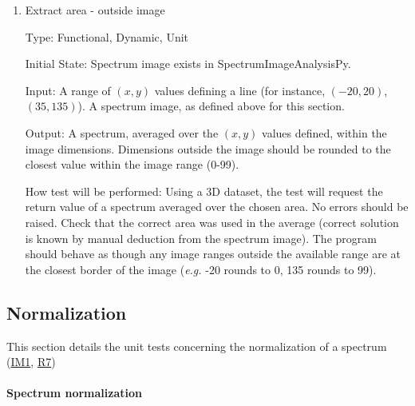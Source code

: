 \documentclass[12pt, titlepage]{article}
\newcommand{\progname}{SpectrumImageAnalysisPy}
\begin{document}
\begin{enumerate}
\item{Extract area - outside image}

Type: Functional, Dynamic, Unit

Initial State: Spectrum image exists in \progname{}.

Input: A range of $(x,y)$ values defining a line (for instance, $(-20, 20)$,
$(35, 135)$). A spectrum image, as defined above for this section.

Output: A spectrum, averaged over the $(x,y)$ values defined, within the image
dimensions. Dimensions outside the image should be rounded to the closest value
within the image range (0-99).

How test will be performed: Using a 3D dataset, the test will request the return
value of a spectrum averaged over the chosen area.  No errors should be raised.
Check that the correct area was used in the average (correct solution is known
by manual deduction from the spectrum image). The program should behave as
though any image ranges outside the available range are at the closest border of
the image (\textit{e.g.} -20 rounds to 0, 135 rounds to 99).

\end{enumerate}

\subsection{Normalization}
This section details the unit tests concerning the normalization of a spectrum
(\hyperref[normalization]{IM1}, \hyperref[R_normalization]{R7})
		
\paragraph{Spectrum normalization}
\end{document}
